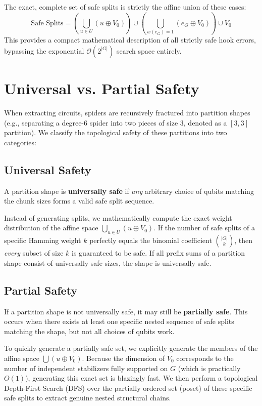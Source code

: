 \documentclass[11pt]{article}
\begin{document}
The exact, complete set of safe splits is strictly the affine union of these cases:
\begin{equation}
    \text{Safe Splits} = \left( \bigcup_{u \in U} (u \oplus V_0) \right) \cup \left( \bigcup_{w(e_G)=1} (e_G \oplus V_0) \right) \cup V_0
\end{equation}
This provides a compact mathematical description of all strictly safe hook errors, bypassing the exponential $\mathcal{O}(2^{|G|})$ search space entirely.

\section{Universal vs. Partial Safety}
When extracting circuits, spiders are recursively fractured into partition shapes (e.g., separating a degree-6 spider into two pieces of size 3, denoted as a $[3,3]$ partition). We classify the topological safety of these partitions into two categories:

\subsection{Universal Safety}
A partition shape is \textbf{universally safe} if \textit{any} arbitrary choice of qubits matching the chunk sizes forms a valid safe split sequence. 

Instead of generating splits, we mathematically compute the exact weight distribution of the affine space $\bigcup_{u \in U} (u \oplus V_0)$. If the number of safe splits of a specific Hamming weight $k$ perfectly equals the binomial coefficient $\binom{|G|}{k}$, then \textit{every} subset of size $k$ is guaranteed to be safe. If all prefix sums of a partition shape consist of universally safe sizes, the shape is universally safe.

\subsection{Partial Safety}
If a partition shape is not universally safe, it may still be \textbf{partially safe}. This occurs when there exists at least one specific nested sequence of safe splits matching the shape, but not all choices of qubits work. 

To quickly generate a partially safe set, we explicitly generate the members of the affine space $\bigcup (u \oplus V_0)$. Because the dimension of $V_0$ corresponds to the number of independent stabilizers fully supported on $G$ (which is practically $O(1)$), generating this exact set is blazingly fast. We then perform a topological Depth-First Search (DFS) over the partially ordered set (poset) of these specific safe splits to extract genuine nested structural chains.
\end{document}
